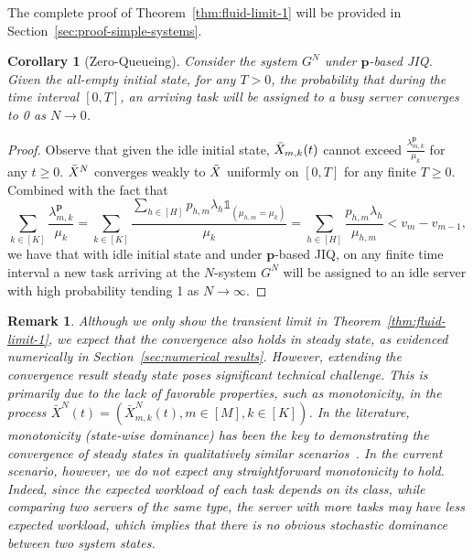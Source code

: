 \documentclass[11pt, reqno]{article}
\newtheorem{corollary}[theorem]{Corollary}
\newtheorem{remark}[theorem]{Remark}
\numberwithin{equation}{section}
\numberwithin{theorem}{section}
\begin{document}
The complete proof of Theorem~\ref{thm:fluid-limit-1} will be provided in Section~\ref{sec:proof-simple-systems}.
\begin{corollary}[Zero-Queueing]
    Consider the system $G^N$ under $\mathbf{p}$-based JIQ. Given the all-empty initial state, for any $T>0$, the probability that during the time interval $[0,T]$, an arriving task will be assigned to a busy server converges to 0 as $N\rightarrow0$.
\end{corollary}
\begin{proof}
    Observe that given the idle initial state, $\Bar{X}_{m,k}(t)$ cannot exceed $\frac{\lambda^{\mathbf{p}}_{m,k}}{\mu_k}$ for any $t\geq 0$. $\Bar{X}^N$ converges weakly to $\Bar{X}$ uniformly on $[0,T]$ for any finite $T\geq 0$. Combined with the fact that $$\sum_{k\in[K]}\frac{\lambda^{\mathbf{p}}_{m,k}}{\mu_k}=\sum_{k\in[K]}\frac{\sum_{h\in[H]}p_{h,m}\lambda_h\mathds{1}_{(\mu_{h,m}=\mu_k)}}{\mu_k}=\sum_{h\in[H]}\frac{p_{h,m}\lambda_h}{\mu_{h,m}}< v_m-v_{m-1},$$ we have that with idle initial state and under $\mathbf{p}$-based JIQ, on any finite time interval a new task arriving at the $N$-system $G^N$  will be assigned to an idle server with high probability tending 1 as $N\to\infty$. 
\end{proof}
\begin{remark}\normalfont
Although we only show the transient limit in Theorem~\ref{thm:fluid-limit-1}, we expect that the convergence also holds in steady state, as evidenced numerically in Section~\ref{sec:numerical results}. 
However, extending the convergence result steady state poses significant technical challenge. 
This is primarily due to the lack of favorable properties, such as monotonicity, in the process $\bar{X}^N(t)=(\bar{X}^N_{m,k}(t),m\in[M],k\in[K])$. 
In the literature, monotonicity (state-wise dominance) has been the key to demonstrating the convergence of steady states in qualitatively similar scenarios~\cite{AS15}. 
In the current scenario, however, we do not expect any straightforward monotonicity to hold. 
Indeed, since the expected workload of each task depends on its class, while comparing two servers of the same type, the server with more tasks may have less expected workload, which implies that there is no obvious stochastic dominance between two system states. 
\end{remark}
\end{document}
